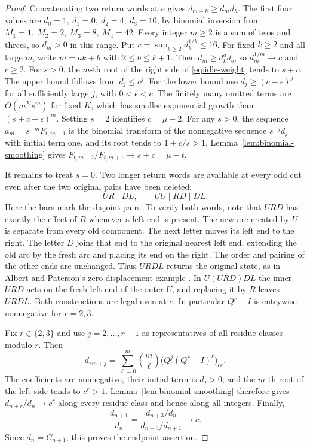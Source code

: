 \begin{proof}
Concatenating two return words at \(e\) gives
\(d_{m+h}\ge d_md_h\). The first four values are
\(d_0=1,\ d_1=0,\ d_2=4,\ d_3=10\), by binomial inversion from
\(M_1=1,\ M_2=2,\ M_3=8,\ M_4=42\). Every integer \(m\ge2\) is
a sum of twos and threes, so \(d_m>0\) in this range. Put
\(c=\sup_{k\ge2} d_k^{1/k}\le16\). For fixed \(k\ge2\) and all
large \(m\), write \(m=ak+b\) with \(2\le b\le k+1\).
Then \(d_m\ge d_k^a d_b\), so \(d_m^{1/m}\to c\) and \(c\ge2\).
For \(s>0\), the \(m\)-th root of the right side of
\eqref{eq:idle-weight} tends to \(s+c\). The upper bound follows
from \(d_j\le c^j\). For the lower bound use \(d_j\ge(c-\epsilon)^j\)
for all sufficiently large \(j\), with \(0<\epsilon<c\). The finitely
many omitted terms are \(O(m^K s^m)\) for fixed \(K\), which has
smaller exponential growth than \((s+c-\epsilon)^m\). Setting \(s=2\)
identifies \(c=\mu-2\). For any \(s>0\), the sequence
\(a_m=s^{-m}F_{t,m+1}\) is the binomial transform of the nonnegative
sequence \(s^{-j}d_j\) with initial term one, and its root tends to
\(1+c/s>1\). Lemma~\ref{lem:binomial-smoothing} gives
\(F_{t,m+2}/F_{t,m+1}\to s+c=\mu-t\).

It remains to treat \(s=0\). Two longer return words are available
at every odd cut even after the two original pairs have been deleted:
\[
               UR\mid DL,\qquad UU\mid RD\mid DL .
\]
Here the bars mark the disjoint pairs. To verify both words, note that
\(URD\) has exactly the effect of \(R\) whenever a left end is present.
The new arc created by \(U\) is separate from every old component.
The next letter moves its left end to the right. The letter \(D\)
joins that end to the original nearest left end, extending the old
arc by the fresh arc and placing its end on the right. The order and
pairing of the other ends are unchanged. Thus \(URDL\) returns the
original state, as in Albert and Paterson's zero-displacement example
\cite{AP}. In \(U(URD)DL\) the inner \(URD\) acts on the fresh
left end of the outer \(U\), and replacing it by \(R\) leaves \(URDL\).
Both constructions are legal even at \(e\). In particular
\(Q^r-I\) is entrywise nonnegative for \(r=2,3\).

Fix \(r\in\{2,3\}\) and use \(j=2,\ldots,r+1\) as representatives
of all residue classes modulo \(r\). Then
\[
 d_{rm+j}
    =\sum_{\ell=0}^m\binom m\ell
         \big(Q^j(Q^r-I)^\ell\big)_{ee}.
\]
The coefficients are nonnegative, their initial term is \(d_j>0\),
and the \(m\)-th root of the left side tends to \(c^r>1\).
Lemma~\ref{lem:binomial-smoothing} therefore gives
\(d_{n+r}/d_n\to c^r\) along every residue class and hence along
all integers. Finally,
\[
    \frac{d_{n+1}}{d_n}
       =\frac{d_{n+3}/d_n}{d_{n+3}/d_{n+1}}\longrightarrow c .
\]
Since \(d_n=C_{n+1}\), this proves the endpoint assertion.
\end{proof}
